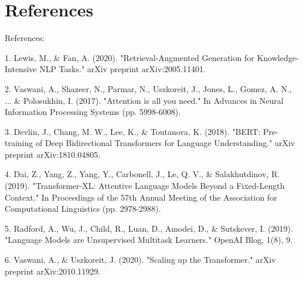 \documentclass{article}
\begin{document}
\section*{References}
References:

1. Lewis, M., & Fan, A. (2020). "Retrieval-Augmented Generation for Knowledge-Intensive NLP Tasks." arXiv preprint arXiv:2005.11401.

2. Vaswani, A., Shazeer, N., Parmar, N., Uszkoreit, J., Jones, L., Gomez, A. N., ... & Polosukhin, I. (2017). "Attention is all you need." In Advances in Neural Information Processing Systems (pp. 5998-6008).

3. Devlin, J., Chang, M. W., Lee, K., & Toutanova, K. (2018). "BERT: Pre-training of Deep Bidirectional Transformers for Language Understanding." arXiv preprint arXiv:1810.04805.

4. Dai, Z., Yang, Z., Yang, Y., Carbonell, J., Le, Q. V., & Salakhutdinov, R. (2019). "Transformer-XL: Attentive Language Models Beyond a Fixed-Length Context." In Proceedings of the 57th Annual Meeting of the Association for Computational Linguistics (pp. 2978-2988).

5. Radford, A., Wu, J., Child, R., Luan, D., Amodei, D., & Sutskever, I. (2019). "Language Models are Unsupervised Multitask Learners." OpenAI Blog, 1(8), 9.

6. Vaswani, A., & Uszkoreit, J. (2020). "Scaling up the Transformer." arXiv preprint arXiv:2010.11929.
\end{document}
